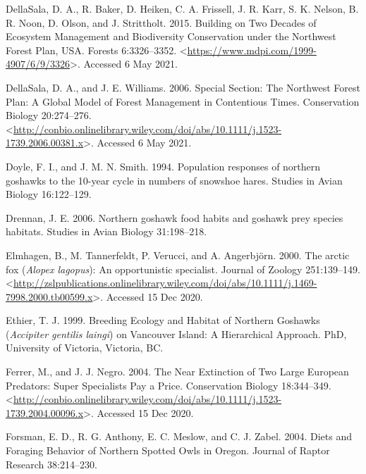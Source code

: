 \documentclass{sfuthesis}
\begin{document}
\leavevmode\hypertarget{ref-dellasala_building_2015}{}%
DellaSala, D. A., R. Baker, D. Heiken, C. A. Frissell, J. R. Karr, S. K. Nelson, B. R. Noon, D. Olson, and J. Strittholt. 2015. Building on Two Decades of Ecosystem Management and Biodiversity Conservation under the Northwest Forest Plan, USA. Forests 6:3326--3352. \textless{}\url{https://www.mdpi.com/1999-4907/6/9/3326}\textgreater. Accessed 6 May 2021.

\leavevmode\hypertarget{ref-dellasala_special_2006}{}%
DellaSala, D. A., and J. E. Williams. 2006. Special Section: The Northwest Forest Plan: A Global Model of Forest Management in Contentious Times. Conservation Biology 20:274--276. \textless{}\url{http://conbio.onlinelibrary.wiley.com/doi/abs/10.1111/j.1523-1739.2006.00381.x}\textgreater. Accessed 6 May 2021.

\leavevmode\hypertarget{ref-doyle_population_1994}{}%
Doyle, F. I., and J. M. N. Smith. 1994. Population responses of northern goshawks to the 10-year cycle in numbers of snowshoe hares. Studies in Avian Biology 16:122--129.

\leavevmode\hypertarget{ref-drennan_northern_2006}{}%
Drennan, J. E. 2006. Northern goshawk food habits and goshawk prey species habitats. Studies in Avian Biology 31:198--218.

\leavevmode\hypertarget{ref-elmhagen_arctic_2000}{}%
Elmhagen, B., M. Tannerfeldt, P. Verucci, and A. Angerbjörn. 2000. The arctic fox (\emph{Alopex lagopus}): An opportunistic specialist. Journal of Zoology 251:139--149. \textless{}\url{http://zslpublications.onlinelibrary.wiley.com/doi/abs/10.1111/j.1469-7998.2000.tb00599.x}\textgreater. Accessed 15 Dec 2020.

\leavevmode\hypertarget{ref-ethier_breeding_1999}{}%
Ethier, T. J. 1999. Breeding Ecology and Habitat of Northern Goshawks (\emph{Accipiter gentilis laingi}) on Vancouver Island: A Hierarchical Approach. PhD, University of Victoria, Victoria, BC.

\leavevmode\hypertarget{ref-ferrer_near_2004}{}%
Ferrer, M., and J. J. Negro. 2004. The Near Extinction of Two Large European Predators: Super Specialists Pay a Price. Conservation Biology 18:344--349. \textless{}\url{http://conbio.onlinelibrary.wiley.com/doi/abs/10.1111/j.1523-1739.2004.00096.x}\textgreater. Accessed 15 Dec 2020.

\leavevmode\hypertarget{ref-forsman_diets_2004}{}%
Forsman, E. D., R. G. Anthony, E. C. Meslow, and C. J. Zabel. 2004. Diets and Foraging Behavior of Northern Spotted Owls in Oregon. Journal of Raptor Research 38:214--230.
\end{document}
